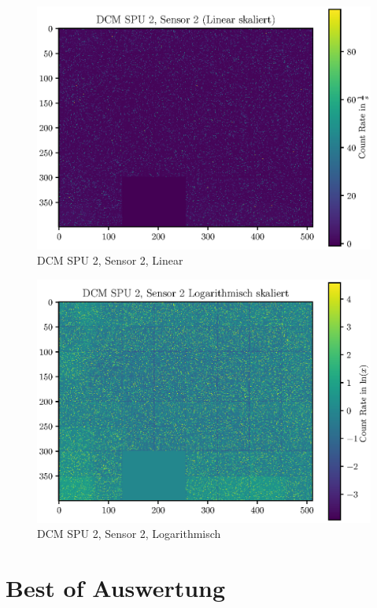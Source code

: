 \documentclass[12pt,twoside,a4paper]{scrartcl}
\begin{document}
			\begin{figure}[H]
				\includegraphics[width = \textwidth]{Plots/DCM/DCM_SPU2_Sensor2_lin.eps}
				\caption{DCM SPU 2, Sensor 2, Linear}
			\end{figure}

			\begin{figure}[H]
				\includegraphics[width = \textwidth]{Plots/DCM/DCM_SPU2_Sensor2_log.eps}
				\caption{DCM SPU 2, Sensor 2, Logarithmisch}
			\end{figure}

			\newpage

\section{Best of Auswertung}
\end{document}
